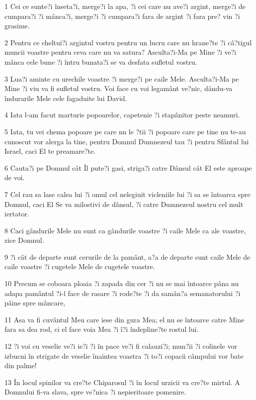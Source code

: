 \par 1 Cei ce sunte?i înseta?i, merge?i la apa, ?i cei care nu ave?i argint, merge?i de cumpara?i ?i mânca?i, merge?i ?i cumpara?i fara de argint ?i fara pre? vin ?i grasime.
\par 2 Pentru ce cheltui?i argintul vostru pentru un lucru care nu hrane?te ?i câ?tigul muncii voastre pentru ceva care nu va satura? Asculta?i-Ma pe Mine ?i ve?i mânca cele bune ?i întru bunata?i se va desfata sufletul vostru.
\par 3 Lua?i aminte cu urechile voastre ?i merge?i pe caile Mele. Asculta?i-Ma pe Mine ?i viu va fi sufletul vostru. Voi face cu voi legamânt ve?nic, dându-va îndurarile Mele cele fagaduite lui David.
\par 4 Iata l-am facut marturie popoarelor, capetenie ?i stapânitor peste neamuri.
\par 5 Iata, tu vei chema popoare pe care nu le ?tii ?i popoare care pe tine nu te-au cunoscut vor alerga la tine, pentru Domnul Dumnezeul tau ?i pentru Sfântul lui Israel, caci El te preamare?te.
\par 6 Cauta?i pe Domnul cât Îl pute?i gasi, striga?i catre Dânsul cât El este aproape de voi.
\par 7 Cel rau sa lase calea lui ?i omul cel nelegiuit vicleniile lui ?i sa se întoarca spre Domnul, caci El Se va milostivi de dânsul, ?i catre Dumnezeul nostru cel mult iertator.
\par 8 Caci gândurile Mele nu sunt ca gândurile voastre ?i caile Mele ca ale voastre, zice Domnul.
\par 9 ?i cât de departe sunt cerurile de la pamânt, a?a de departe sunt caile Mele de caile voastre ?i cugetele Mele de cugetele voastre.
\par 10 Precum se coboara ploaia ?i zapada din cer ?i nu se mai întoarce pâna nu adapa pamântul ?i-l face de rasare ?i rode?te ?i da samân?a semanatorului ?i pâine spre mâncare,
\par 11 Asa va fi cuvântul Meu care iese din gura Mea; el nu se întoarce catre Mine fara sa dea rod, ci el face voia Mea ?i î?i îndepline?te rostul lui.
\par 12 ?i voi cu veselie ve?i ie?i ?i în pace ve?i fi calauzi?i; mun?ii ?i colinele vor izbucni în strigate de veselie înaintea voastra ?i to?i copacii câmpului vor bate din palme!
\par 13 În locul spinilor va cre?te Chiparosul ?i în locul urzicii va cre?te mirtul. A Domnului fi-va slava, spre ve?nica ?i nepieritoare pomenire.

